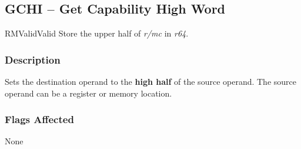 \clearpage
{}
{}
\subsection*{GCHI -- Get Capability High Word}

\begin{x86opcodetable}
  {RM}{Valid}{Valid}
  {Store the upper half of \emph{r/mc} in \emph{r64}.}
\end{x86opcodetable}

\begin{x86opentable}
\end{x86opentable}

\subsubsection*{Description}

Sets the destination operand to the \textbf{high half} of the source
operand.  The source operand can be a register or memory location.

\subsubsection*{Flags Affected}

None
